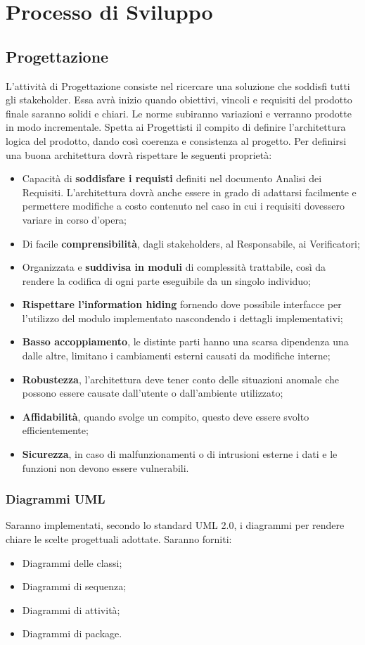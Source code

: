 \documentclass[11pt,a4paper]{article}
\begin{document}
	\section{Processo di Sviluppo}
	\subsection{Progettazione}
	L'attività di Progettazione consiste nel ricercare una soluzione che soddisfi tutti gli stakeholder. Essa avrà inizio quando obiettivi, vincoli e requisiti del prodotto finale saranno solidi e chiari. Le norme subiranno variazioni e verranno prodotte in modo incrementale. Spetta ai Progettisti il compito di definire l'architettura logica del prodotto, dando così coerenza e consistenza al progetto. Per definirsi una buona architettura dovrà rispettare le seguenti proprietà:
	\begin{itemize}
		\item Capacità di \textbf{soddisfare i requisti} definiti nel documento Analisi dei Requisiti. L'architettura dovrà anche essere in grado di adattarsi facilmente e permettere modifiche a costo contenuto nel caso in cui i requisiti dovessero variare in corso d'opera;
		\item Di facile \textbf{comprensibilità}, dagli stakeholders, al Responsabile, ai Verificatori;
		\item Organizzata e \textbf{suddivisa in moduli} di complessità trattabile, così da rendere la codifica di ogni parte eseguibile da un singolo individuo;
		\item \textbf{Rispettare l'information hiding} fornendo dove possibile interfacce per l'utilizzo del modulo implementato nascondendo i dettagli implementativi;
		\item \textbf{Basso accoppiamento}, le distinte parti hanno una scarsa dipendenza una dalle altre, limitano i cambiamenti esterni causati da modifiche interne;
		\item \textbf{Robustezza}, l'architettura deve tener conto delle situazioni anomale che possono essere causate dall'utente o dall'ambiente utilizzato;
		\item \textbf{Affidabilità}, quando svolge un compito, questo deve essere svolto efficientemente;
		\item \textbf{Sicurezza}, in caso di malfunzionamenti o di intrusioni esterne i dati e le funzioni non devono essere vulnerabili.
	\end{itemize}	
	\subsubsection{Diagrammi UML} Saranno implementati, secondo lo standard UML 2.0, i diagrammi per rendere chiare le scelte progettuali adottate. Saranno forniti:
	\begin{itemize}
		\item Diagrammi delle classi;
		\item Diagrammi di sequenza;
		\item Diagrammi di attività;
		\item Diagrammi di package.
	\end{itemize}
\end{document}
